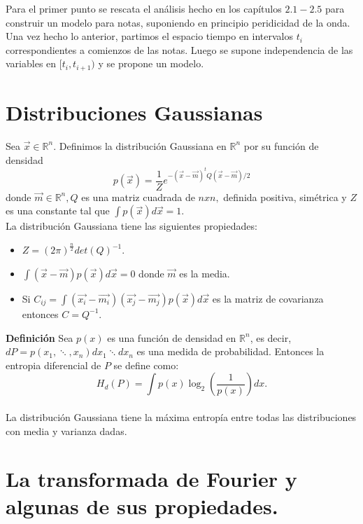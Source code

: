 \documentclass[a4paper]{article}
\begin{document}
\noindent Para el primer punto se rescata el análisis hecho en los capítulos $2.1-2.5$ para construir un modelo para notas, suponiendo en principio peridicidad de la onda. Una vez hecho lo anterior, partimos el espacio tiempo en intervalos $t_{i}$ correspondientes a comienzos de las notas. Luego se supone independencia de las variables en $[t_{i},t_{i+1})$ y se propone un modelo.\\

\section{\sffamily Distribuciones Gaussianas}
Sea $\overrightarrow{x} \in \mathbb{R}^{n}.$ Definimos la distribución Gaussiana en $\mathbb{R}^{n}$ por su función de densidad $$
p(\overrightarrow{x})=\frac{1}{Z}e^{-(\overrightarrow{x}-\overrightarrow{m})^{t} Q (\overrightarrow{x}-\overrightarrow{m})/2}
$$ donde $\overrightarrow{m}\in \mathbb{R}^{n}, Q$ es una matriz cuadrada de $nxn,$ definida positiva, simétrica y $Z$ es una constante tal que $\int p(\overrightarrow{x})d\overrightarrow{x}=1.$\\
La distribución Gaussiana tiene las siguientes propiedades:
\begin{itemize}
\item $Z=(2\pi)^{\frac{n}{2}} det(Q)^{-1}$.
\item $\int (\overrightarrow{x}-\overrightarrow{m})p(\overrightarrow{x})d\overrightarrow{x}=0$ donde $\overrightarrow{m}$ es la media.
\item Si $C_{ij}=\int (\overrightarrow{x_{i}}-\overrightarrow{m_{i}})(\overrightarrow{x_{j}}-\overrightarrow{m_{j}})p(\overrightarrow{x})d\overrightarrow{x}$ es la matriz de covarianza entonces $C=Q^{-1}$.
\end{itemize}
\textbf{Definición} Sea $p(x)$ es una función de densidad en $\mathbb{R}^{n}$, es decir, $dP=p(x_{1},\ddots,x_{n})dx_{1}\ddots dx_{n}$ es una medida de probabilidad. Entonces la entropia diferencial de $P$ se define como:
$$
H_{d}(P)=\int p(x)\log_{2}(\frac{1}{p(x)})dx.
$$\\
La distribución Gaussiana tiene la máxima entropía entre todas las distribuciones con media y varianza dadas.\\


\section{\sffamily La transformada de Fourier y algunas de sus propiedades.}
\end{document}
